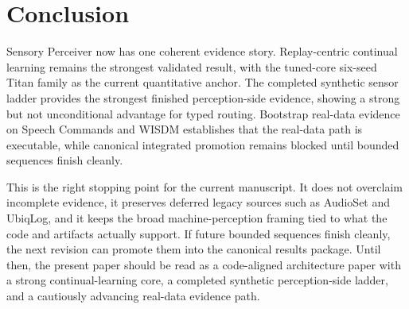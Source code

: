 \documentclass{article}
\begin{document}
\section{Conclusion}

Sensory Perceiver now has one coherent evidence story. Replay-centric continual learning remains the strongest validated result, with the tuned-core six-seed Titan family as the current quantitative anchor. The completed synthetic sensor ladder provides the strongest finished perception-side evidence, showing a strong but not unconditional advantage for typed routing. Bootstrap real-data evidence on Speech Commands and WISDM establishes that the real-data path is executable, while canonical integrated promotion remains blocked until bounded sequences finish cleanly.

This is the right stopping point for the current manuscript. It does not overclaim incomplete evidence, it preserves deferred legacy sources such as AudioSet and UbiqLog, and it keeps the broad machine-perception framing tied to what the code and artifacts actually support. If future bounded sequences finish cleanly, the next revision can promote them into the canonical results package. Until then, the present paper should be read as a code-aligned architecture paper with a strong continual-learning core, a completed synthetic perception-side ladder, and a cautiously advancing real-data evidence path.



\end{document}
